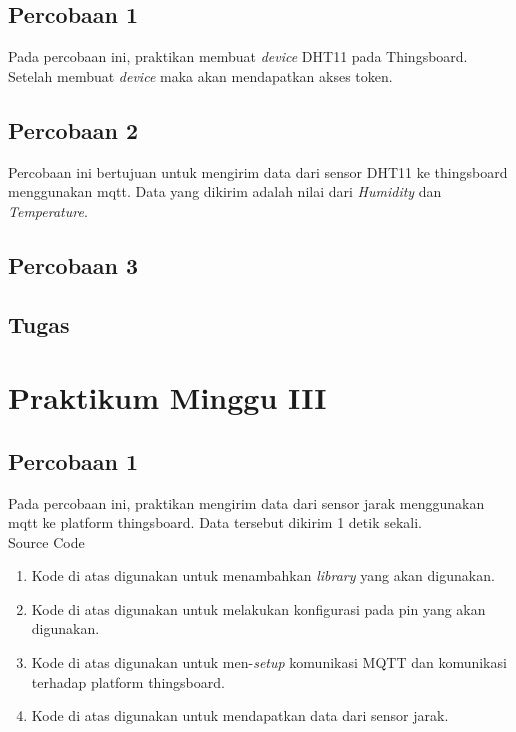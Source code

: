 \documentclass{class}
\begin{document}
  \subsection{Percobaan 1}
    Pada percobaan ini, praktikan membuat \emph{device} DHT11 pada Thingsboard.
    Setelah membuat \emph{device} maka akan mendapatkan akses token.
  \subsection{Percobaan 2}
    Percobaan ini bertujuan untuk mengirim data dari sensor DHT11 ke thingsboard menggunakan mqtt.
    Data yang dikirim adalah nilai dari \emph{Humidity} dan \emph{Temperature}.

  \subsection{Percobaan 3}
  \subsection{Tugas}
\section{Praktikum Minggu III}
    \subsection{Percobaan 1}
    Pada percobaan ini, praktikan mengirim data dari sensor jarak menggunakan mqtt ke platform thingsboard.
    Data tersebut dikirim 1 detik sekali. \\
    Source Code
    \begin{enumerate}
      \item 
      Kode di atas digunakan untuk menambahkan \emph{library} yang akan digunakan. \\
      \item 
      Kode di atas digunakan untuk melakukan konfigurasi pada pin yang akan digunakan. \\
      \item 
      Kode di atas digunakan untuk men-\emph{setup} komunikasi MQTT dan komunikasi terhadap platform thingsboard. \\
      \item 
      Kode di atas digunakan untuk mendapatkan data dari sensor jarak.
    \end{enumerate}
\end{document}
